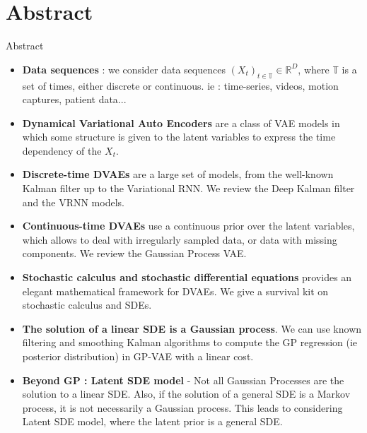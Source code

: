 \section{Abstract}\label{Abstract}

\begin{frame}{Abstract}
    \begin{itemize}
        \item <1-> \textbf{Data sequences} : we consider data sequences $(X_t)_{t \in \mathbb{T}} \in \mathbb{R}^D$, where $\mathbb{T}$ is a set of times, either discrete or continuous. ie : time-series, videos, motion captures, patient data...
        \item <2-> \textbf{Dynamical Variational Auto Encoders} are a class of VAE models in which some structure is given to the latent variables to express the time dependency of the $X_t$.
        \item <3-> \textbf{Discrete-time DVAEs} are a large set of models, from the well-known Kalman filter up to the Variational RNN. We review the Deep Kalman filter and the VRNN models.
        \item <4-> \textbf{Continuous-time DVAEs} use a continuous prior over the latent variables, which allows to deal with irregularly sampled data, or data with missing components. We review the Gaussian Process VAE.
        \item <5-> \textbf{Stochastic calculus and stochastic differential equations} provides an elegant mathematical framework for DVAEs. We give a survival kit on stochastic calculus and SDEs.
        \item <6-> \textbf{The solution of a linear SDE is a Gaussian process}. We can use known filtering and smoothing Kalman algorithms to compute the GP regression (ie posterior distribution) in GP-VAE with a linear cost.
        \item <7-> \textbf{Beyond GP : Latent SDE model} - Not all Gaussian Processes are the solution to a linear SDE. Also, if the solution of a general SDE is a Markov process, it is not necessarily a Gaussian process. This leads to considering Latent SDE model, where the latent prior is a general SDE.
    \end{itemize}
\end{frame}